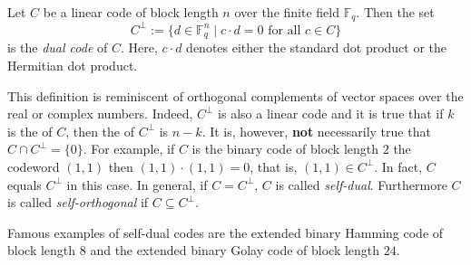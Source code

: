\documentclass[12pt]{article}
\newcommand{\mbb}{\mathbb}
\begin{document}
Let $C$ be a linear code of block length $n$ over the finite field
$\mbb{F}_q$. Then the set
\begin{equation*}
C^\perp:=\{d\in\mbb{F}_q^n\mid c\cdot d=0\text{ for all }c\in C\}
\end{equation*}
is the \emph{dual code} of $C$. Here, $c\cdot d$ denotes either the
standard dot product or the Hermitian dot product.

This definition is reminiscent of orthogonal complements of  vector spaces over the real or complex numbers. Indeed,
$C^\perp$ is also a linear code and it is true that if $k$ is the
 of $C$, then the  of
$C^\perp$ is $n-k$. It is, however, \textbf{not} necessarily true that
$C\cap C^\perp=\{0\}$. For example, if $C$ is the binary code of block
length $2$  the codeword $(1,1)$ then $(1,1)\cdot(1,1)=0$,
that is, $(1,1)\in C^\perp$. In fact, $C$ equals $C^\perp$ in this
case. In general, if $C=C^\perp$, $C$ is called
\emph{self-dual}. Furthermore $C$ is called \emph{self-orthogonal} if
$C\subseteq C^\perp$.

Famous examples of self-dual codes are the extended binary Hamming
code of block length $8$ and the extended binary Golay code of block
length $24$.
\end{document}
